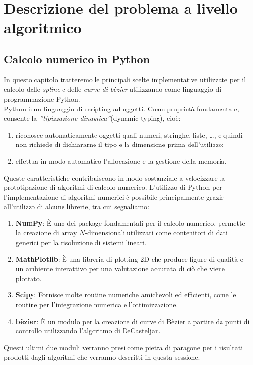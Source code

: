 \documentclass[a4paper,12pt]{report}
\theoremstyle{definition}
\begin{document}
\chapter{Descrizione del problema a livello algoritmico}
\section{Calcolo numerico in Python}
In questo capitolo tratteremo le principali scelte implementative utilizzate per il calcolo delle \textit{spline} e delle \textit{curve di bèzier} utilizzando come linguaggio di programmazione Python.\\
Python è un linguaggio di scripting ad oggetti. Come proprietà fondamentale, consente
la \textit{”tipizzazione dinamica”}(dynamic typing), cioè:
	\begin{enumerate}
		\item  riconosce automaticamente oggetti quali numeri, stringhe, liste, \ldots, e quindi non
		richiede di dichiararne il tipo e la dimensione prima dell’utilizzo;
		\item effettua in modo automatico l’allocazione e la gestione della memoria.
	\end{enumerate}
Queste caratteristiche contribuiscono in modo sostanziale a velocizzare la prototipazione di algoritmi di calcolo numerico.
L'utilizzo di Python per l'implementazione di algoritmi numerici è possibile principalmente grazie all'utilizzo di alcune librerie, tra cui segnaliamo:
	\begin{enumerate}
		\item \textbf{NumPy}: È uno dei package fondamentali per il calcolo numerico, permette la creazione di array $N$-dimensionali utilizzati come contenitori di dati generici per la risoluzione di sistemi lineari.
		\item \textbf{MathPlotlib}: È una libreria di plotting 2D che produce figure di qualità e un ambiente interattivo per una valutazione accurata di ciò che viene plottato.
		\item \textbf{Scipy}: Fornisce molte routine numeriche amichevoli ed efficienti, come le routine per l'integrazione numerica e l'ottimizzazione.
		\item \textbf{bèzier}: È un modulo per la creazione di curve di Bèzier a partire da punti di controllo utilizzando l'algoritmo di DeCasteljau.
	\end{enumerate}  
Questi ultimi due moduli verranno presi come pietra di paragone per i risultati prodotti dagli algoritmi che verranno descritti in questa sessione.
\end{document}
